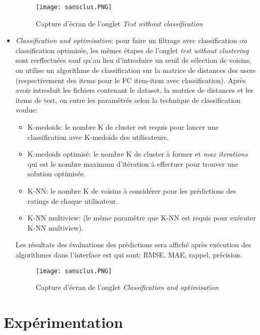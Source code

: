 \begin{itemize}
	\begin{figure}[H]
		\centering
		\texttt{[image: sansclus.PNG]}
		\caption{Capture d'écran de l'onglet \textit{Test without classification}}
		\label{fig:sansclus}
	\end{figure}
	\item \textit{Classification and optimisation}: pour faire un filtrage avec classification ou classification optimisée,  les mêmes étapes de l'onglet \textit{test without clustering} sont reeffectuées sauf qu'au lieu d'introduire un seuil de sélection de voisins, on utilise un algorithme de classification sur la matrice de distances des users (respectivement des items pour le FC item-item avec classification).
	Après avoir introduit les fichiers contenant le dataset, la matrice de distances et les items de test, on entre les paramétrés selon la technique de classification voulue:
	
	\begin{itemize}
		\item K-medoids: le nombre K de cluster est requis pour lancer une classification avec K-medoids des utilisateurs.
		\item K-medoids optimisé: le nombre K de cluster à former et \textit{max iterations} qui est le nombre maximum d'itération à effectuer pour trouver une solution optimisée.
		\item K-NN: le nombre K de voisins à considérer pour les prédictions des ratings de chaque utilisateur.
		\item K-NN multiview: (le même paramètre que K-NN est requis pour exécuter K-NN multiview).
	\end{itemize} 
	Les résultats des évaluations des prédictions sera affiché après exécution des algorithmes dans l'interface est qui sont: RMSE, MAE, rappel, précision. 

\begin{figure}[H]
	\centering
	\texttt{[image: sansclus.PNG]}
	\caption{Capture d'écran de l'onglet \textit{Classification and optimisation}}
	\label{fig:clasificationonglet}
\end{figure}


\end{itemize}



\section{Expérimentation}
